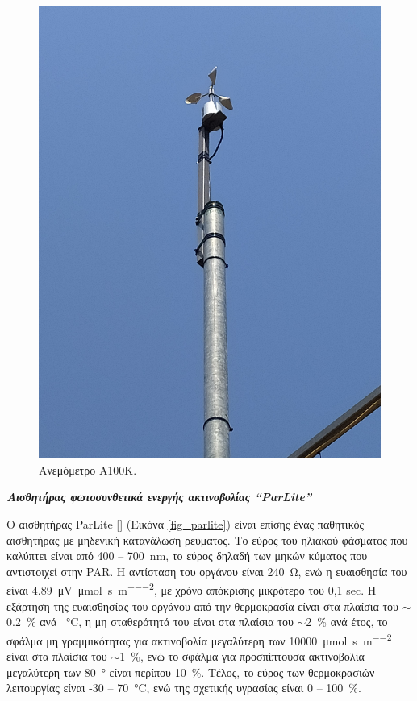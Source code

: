 \documentclass[12pt, a4paper]{report} %
\DeclareRobustCommand{\lcitep}[1]{%
  \english{[\cite{#1}]}%
}
\newcommand{\english}{\foreignlanguage{english}}
\begin{document}
\begin{figure}[ht]%
    \centering
    \includegraphics[scale=0.08]{Figures/anemometer.jpg}
    \caption{Ανεμόμετρο \english{A100K}.}
    \label{fig_anemometer}
\end{figure}

\vspace{0.4cm}

\noindent \textit{\textbf{Αισθητήρας φωτοσυνθετικά ενεργής ακτινοβολίας \english{“ParLite”}}}

\vspace{0.2cm}

Ο αισθητήρας \english{ParLite} \lcitep{diataksi_bib5} (Εικόνα \ref{fig_parlite}) είναι επίσης ένας παθητικός 
αισθητήρας με μηδενική κατανάλωση ρεύματος. Το εύρος του ηλιακού φάσματος που καλύπτει είναι από 400 – 
\SI{700}{\nano\meter}, το εύρος δηλαδή των μηκών κύματος που αντιστοιχεί στην \english{PAR}. Η αντί\-σταση 
του οργάνου είναι \SI{240}{\ohm}, ενώ η ευαισθησία του είναι 
\SI{4,89}{\micro\volt\per\micro\mol\per\second\per\meter\squared}, με χρόνο απόκρισης μικρότερο του 0,1 \english{sec}. 
Η εξάρτηση της ευαισθησίας του οργάνου από την θερμοκρασία είναι στα πλαίσια του $\sim$\SI{0,2}{\percent} ανά 
\SI{}{\degreeCelsius}, η μη σταθερότητά του είναι στα πλαίσια του $\sim$\SI{2}{\percent} ανά έτος, το σφάλμα μη 
γραμμικότητας για ακτινοβολία μεγαλύτερη των \SI{10000}{\micro\mol\per\second\per\meter\squared} είναι στα πλαίσια 
του $\sim$\SI{1}{\percent}, ενώ το σφάλμα για προσπίπτουσα ακτινοβολία μεγαλύτερη των \SI{80}{\degree} είναι περίπου 
\SI{10}{\percent}. Τέλος, το εύρος των θερμοκρασιών λειτουργίας είναι -30 – \SI{70}{\degreeCelsius}, ενώ της σχετικής 
υγρασίας είναι 0 – \SI{100}{\percent}.
\end{document}
